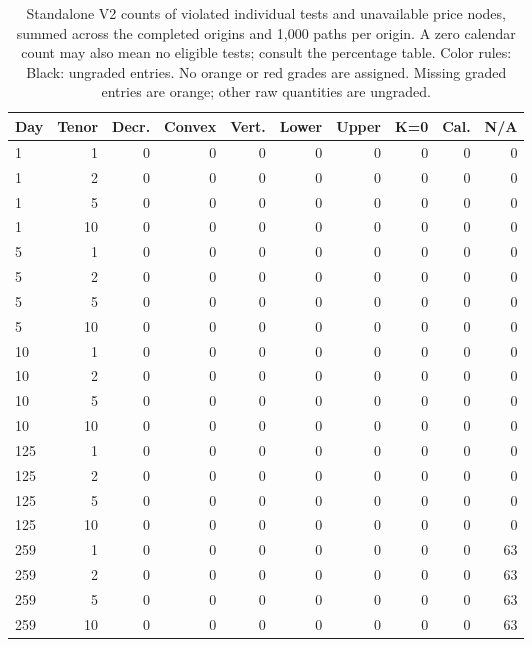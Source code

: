 \documentclass[11pt]{article}
\begin{document}
\begin{table}[H]\centering\small\setlength{\tabcolsep}{4pt}
\caption{Standalone V2 counts of violated individual tests and unavailable price nodes, summed across the completed origins and 1,000 paths per origin. A zero calendar count may also mean no eligible tests; consult the percentage table. Color rules: Black: ungraded entries. No orange or red grades are assigned. Missing graded entries are orange; other raw quantities are ungraded.}\label{tab:standalone-v2-static-counts}
\begin{tabular}{@{}lrrrrrrrrr@{}}
\toprule
Day & Tenor & Decr. & Convex & Vert. & Lower & Upper & K=0 & Cal. & N/A \\
\midrule
1 & 1 & 0 & 0 & 0 & 0 & 0 & 0 & 0 & 0 \\
1 & 2 & 0 & 0 & 0 & 0 & 0 & 0 & 0 & 0 \\
1 & 5 & 0 & 0 & 0 & 0 & 0 & 0 & 0 & 0 \\
1 & 10 & 0 & 0 & 0 & 0 & 0 & 0 & 0 & 0 \\
5 & 1 & 0 & 0 & 0 & 0 & 0 & 0 & 0 & 0 \\
5 & 2 & 0 & 0 & 0 & 0 & 0 & 0 & 0 & 0 \\
5 & 5 & 0 & 0 & 0 & 0 & 0 & 0 & 0 & 0 \\
5 & 10 & 0 & 0 & 0 & 0 & 0 & 0 & 0 & 0 \\
10 & 1 & 0 & 0 & 0 & 0 & 0 & 0 & 0 & 0 \\
10 & 2 & 0 & 0 & 0 & 0 & 0 & 0 & 0 & 0 \\
10 & 5 & 0 & 0 & 0 & 0 & 0 & 0 & 0 & 0 \\
10 & 10 & 0 & 0 & 0 & 0 & 0 & 0 & 0 & 0 \\
125 & 1 & 0 & 0 & 0 & 0 & 0 & 0 & 0 & 0 \\
125 & 2 & 0 & 0 & 0 & 0 & 0 & 0 & 0 & 0 \\
125 & 5 & 0 & 0 & 0 & 0 & 0 & 0 & 0 & 0 \\
125 & 10 & 0 & 0 & 0 & 0 & 0 & 0 & 0 & 0 \\
259 & 1 & 0 & 0 & 0 & 0 & 0 & 0 & 0 & 63 \\
259 & 2 & 0 & 0 & 0 & 0 & 0 & 0 & 0 & 63 \\
259 & 5 & 0 & 0 & 0 & 0 & 0 & 0 & 0 & 63 \\
259 & 10 & 0 & 0 & 0 & 0 & 0 & 0 & 0 & 63 \\
\bottomrule\end{tabular}\end{table}
\end{document}
